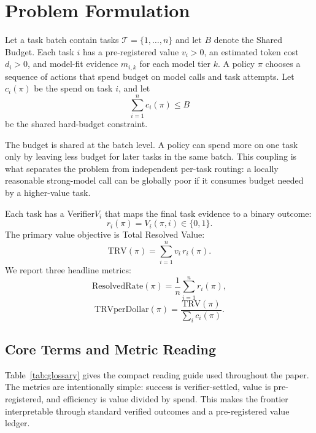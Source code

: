 \documentclass[sigconf,review,anonymous]{acmart}
\newcommand{\sharedbudget}{Shared Budget\xspace}
\newcommand{\verifier}{Verifier\xspace}
\begin{document}
\section{Problem Formulation}
\label{sec:formulation}
Let a task batch contain tasks $\mathcal{T}=\{1,\ldots,n\}$ and let $B$ denote the \sharedbudget. Each task $i$ has a pre-registered value $v_i>0$, an estimated token cost $d_i>0$, and model-fit evidence $m_{i,k}$ for each model tier $k$. A policy $\pi$ chooses a sequence of actions that spend budget on model calls and task attempts. Let $c_i(\pi)$ be the spend on task $i$, and let
\[
    \sum_{i=1}^{n} c_i(\pi) \le B
\]
be the shared hard-budget constraint.

The budget is shared at the batch level. A policy can spend more on one task only by leaving less budget for later tasks in the same batch. This coupling is what separates the problem from independent per-task routing: a locally reasonable strong-model call can be globally poor if it consumes budget needed by a higher-value task.

Each task has a \verifier $V_i$ that maps the final task evidence to a binary outcome:
\[
    r_i(\pi)=V_i(\pi,i)\in\{0,1\}.
\]
The primary value objective is Total Resolved Value:
\[
    \mathrm{TRV}(\pi)=\sum_{i=1}^{n} v_i\,r_i(\pi).
\]
We report three headline metrics:
\[
    \mathrm{ResolvedRate}(\pi)=\frac{1}{n}\sum_{i=1}^{n}r_i(\pi),
\]
\[
    \mathrm{TRVperDollar}(\pi)=
    \frac{\mathrm{TRV}(\pi)}{\sum_i c_i(\pi)}.
\]

\subsection{Core Terms and Metric Reading}
Table~\ref{tab:glossary} gives the compact reading guide used throughout the paper. The metrics are intentionally simple: success is verifier-settled, value is pre-registered, and efficiency is value divided by spend. This makes the frontier interpretable through standard verified outcomes and a pre-registered value ledger.
\end{document}
